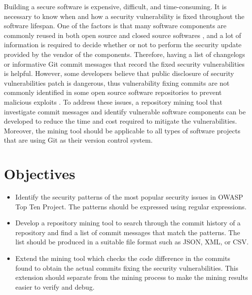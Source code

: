 \documentclass[12pt, a4paper]{report}
\begin{document}
Building a secure software is expensive, difficult, and time-consuming. It is necessary to know when
and how a security vulnerability is fixed throughout the software lifespan. One of the factors is
that many software components are commonly reused in both open source and closed source softwares
\cite{khan_2001}, and a lot of information is required to decide whether or not to perform the
security update provided by the vendor of the components. Therefore, having a list of changelogs or
informative Git commit messages that record the fixed security vulnerabilities is helpful. However,
some developers believe that public disclosure of security vulnerabilities patch is dangerous, thus
vulnerability fixing commits are not commonly identified in some open source software repositories
to prevent malicious exploits \cite{arora_2005}. To address these issues, a repository mining tool
that investigate commit messages and identify vulnerable software components can be developed to
reduce the time and cost required to mitigate the vulnerabilities. Moreover, the mining tool should
be applicable to all types of software projects that are using Git as their version control system.

\section{Objectives} \label{sec:objectives}
\begin{itemize}
	\item Identify the security patterns of the most popular security issues in OWASP Top Ten Project.
	The patterns should be expressed using regular expressions.
	\item Develop a repository mining tool to search through the commit history of a repository and
	find a list of commit messages that match the patterns. The list should be produced in a suitable
	file format such as JSON, XML, or CSV.
	\item Extend the mining tool which checks the code difference in the commits found to obtain the
	actual commits fixing the security vulnerabilities. This extension should separate from the mining
	process to make the mining results easier to verify and debug.
\end{itemize}
\end{document}

